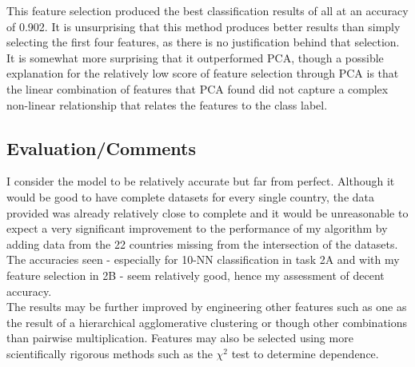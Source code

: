\documentclass{article}
\begin{document}
This feature selection produced the best classification results of all at an accuracy of 0.902. It is unsurprising that this method produces better results than simply selecting the first four features, as there is no justification behind that selection. It is somewhat more surprising that it outperformed PCA, though a possible explanation for the relatively low score of feature selection through PCA is that the linear combination of features that PCA found did not capture a complex non-linear relationship that relates the features to the class label.
\subsection*{Evaluation/Comments}
I consider the model to be relatively accurate but far from perfect. Although it would be good to have complete datasets for every single country, the data provided was already relatively close to complete and it would be unreasonable to expect a very significant improvement to the performance of my algorithm by adding data from the 22 countries missing from the intersection of the datasets. The accuracies seen - especially for 10-NN classification in task 2A and with my feature selection in 2B - seem relatively good, hence my assessment of decent accuracy.\\[2mm]
The results may be further improved by engineering other features such as one as the result of a hierarchical agglomerative clustering or though other combinations than pairwise multiplication. Features may also be selected using more scientifically rigorous methods such as the $\chi^2$ test to determine dependence.
\end{document}
